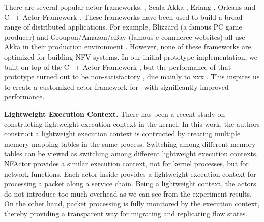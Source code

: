
There are several popular actor frameworks, \eg, Scala Akka \cite{akka}, Erlang \cite{erlang}, Orleans \cite{Orleans} and C++ Actor Framework \cite{caf}. These frameworks have been used to build a broad range of distributed applications. %
 For example, Blizzard (a famous PC game producer) and Groupon/Amazon/eBay (famous e-commerce websites) all use Akka in their production environment \cite{akka}. However, none of these frameworks are optimized for building NFV systems. In our initial prototype implementation, we built \nfactor on top of the C++ Actor Framework \cite{caf}, but the performance of that prototype turned out to be non-satisfactory , due mainly to xxx . This inspires us to create a customized actor framework for \nfactor~with  significantly improved performance.

\textbf{Lightweight Execution Context.}
There has been a recent study on constructing lightweight execution context \cite{litton2016light} in the kernel. In this work, the authors construct a lightweight execution context is contructed by creating multiple memory mapping tables in the same process. Switching among different memory tables can be viewed as switching among different lightweight execution contexts. NFActor provides a similar execution context, not for kernel processes, but for network functions. Each actor inside \nfactor provides a lightweight execution context for processing a packet along a service chain. Being a lightweight context, the actors do not introduce too much overhead as we can see from the experiment results. On the other hand, packet processing is fully monitored by the execution context, thereby providing a transparent way for migrating and replicating flow states.
